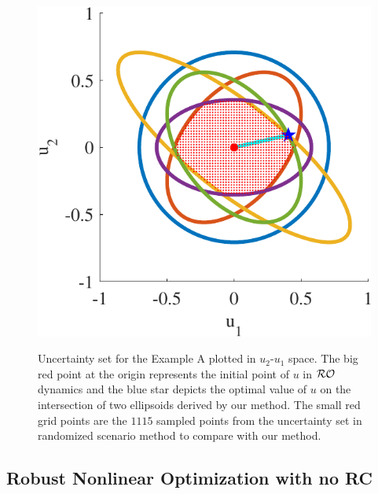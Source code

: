 \documentclass[journal,twoside,web]{ieeecolor}
\begin{document}
\begin{figure}
\begin{center}
\includegraphics[scale=0.55]{ellipsoids}
\vspace{-1.5mm}
\caption{Uncertainty set for the Example A plotted in $u_
2$-$u_1$ space. The big red point at the origin represents the initial point of $u$ in ${\cal RO}$ dynamics and the blue star depicts the optimal value of $u$ on the intersection of two ellipsoids derived by our method. The small red grid points are the $1115$ sampled points from the uncertainty set in randomized scenario method \cite{calafiore2004} to compare with our method.}
\vspace{-8mm}
\label{ellipsoids}
\end{center}
\end{figure}

\subsection{Robust Nonlinear Optimization with no RC}\label{norc.sec}
\end{document}
